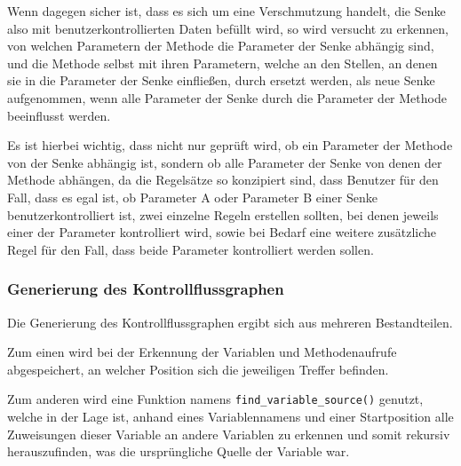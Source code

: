                 Wenn dagegen sicher ist,
                dass es sich um eine Verschmutzung handelt,
                die Senke also mit benutzerkontrollierten Daten befüllt wird,
                so wird versucht zu erkennen,
                von welchen Parametern der Methode die Parameter der Senke abhängig sind,
                und
                die Methode selbst mit ihren Parametern,
                welche an den Stellen,
                an denen sie in die Parameter der Senke einfließen,
                durch
                 ersetzt werden,
                als neue Senke aufgenommen,
                wenn alle Parameter der Senke durch die Parameter der Methode beeinflusst werden.

                Es ist hierbei wichtig,
                dass nicht nur geprüft wird,
                ob ein Parameter der Methode von der Senke abhängig ist,
                sondern ob alle Parameter der Senke von denen der Methode abhängen,
                da die Regelsätze so konzipiert sind,
                dass Benutzer für den Fall,
                dass es egal ist,
                ob Parameter A oder
                Parameter B einer Senke benutzerkontrolliert ist,
                zwei einzelne Regeln erstellen sollten,
                bei denen jeweils einer der Parameter kontrolliert wird,
                sowie
                bei Bedarf eine weitere zusätzliche Regel für den Fall,
                dass beide Parameter kontrolliert werden sollen.

            \subsubsection{Generierung des Kontrollflussgraphen}
                Die Generierung des Kontrollflussgraphen ergibt sich aus mehreren Bestandteilen.

                Zum einen wird bei der Erkennung der Variablen und
                Methodenaufrufe abgespeichert,
                an welcher Position sich die jeweiligen Treffer befinden.

                Zum anderen wird eine Funktion namens
                \lstinline{find_variable_source()} genutzt,
                welche in der Lage ist,
                anhand eines Variablennamens und
                einer Startposition alle Zuweisungen dieser Variable an andere Variablen zu erkennen und
                somit rekursiv herauszufinden,
                was die ursprüngliche Quelle der Variable war.

